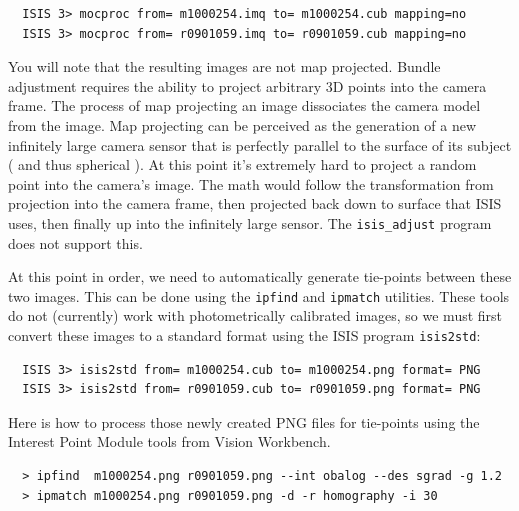 \begin{verbatim}
  ISIS 3> mocproc from= m1000254.imq to= m1000254.cub mapping=no
  ISIS 3> mocproc from= r0901059.imq to= r0901059.cub mapping=no
\end{verbatim}

You will note that the resulting images are not map projected. Bundle
adjustment requires the ability to project arbitrary 3D points into
the camera frame. The process of map projecting an image dissociates
the camera model from the image. Map projecting can be perceived as
the generation of a new infinitely large camera sensor that is
perfectly parallel to the surface of its subject ( and thus spherical
). At this point it's extremely hard to project a random point into
the camera's image. The math would follow the transformation from
projection into the camera frame, then projected back down to surface
that ISIS uses, then finally up into the infinitely large sensor. The
\texttt{isis\_adjust} program does not support this.

At this point in order, we need to automatically generate tie-points between
these two images.  This can be done using the \texttt{ipfind} and
\texttt{ipmatch} utilities.  These tools do not (currently) work
with photometrically calibrated images, so we must first convert
these images to a standard format using the \ac{ISIS} program
\texttt{isis2std}:

\begin{verbatim}
  ISIS 3> isis2std from= m1000254.cub to= m1000254.png format= PNG
  ISIS 3> isis2std from= r0901059.cub to= r0901059.png format= PNG
\end{verbatim}

Here is how to process those newly created PNG files for tie-points
using the Interest Point Module tools from Vision Workbench.

\begin{verbatim}
  > ipfind  m1000254.png r0901059.png --int obalog --des sgrad -g 1.2
  > ipmatch m1000254.png r0901059.png -d -r homography -i 30
\end{verbatim}

\begin{center}
\end{center}

